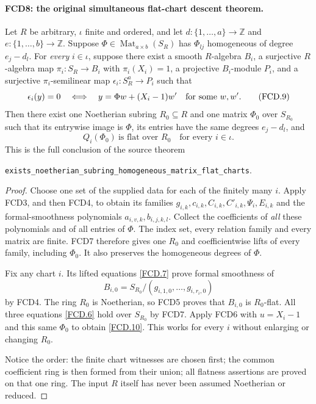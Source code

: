 \paragraph{FCD8: the original simultaneous flat-chart descent theorem.}
\label{claim:FCD8}
Let $R$ be arbitrary, $\iota$ finite and ordered, and let
$d:\{1,\ldots,a\}\to\mathbb Z$ and
$e:\{1,\ldots,b\}\to\mathbb Z$.  Suppose
$\Phi\in\operatorname{Mat}_{a\times b}(S_R)$ has
$\Phi_{lj}$ homogeneous of degree $e_j-d_l$.
For \emph{every} $i\in\iota$, suppose there exist a smooth
$R$-algebra $B_i$, a surjective $R$-algebra map $\pi_i:S_R\to B_i$
with $\pi_i(X_i)=1$, a projective $B_i$-module $P_i$, and a
surjective $\pi_i$-semilinear map $\epsilon_i:S_R^a\to P_i$
such that
\[
 \epsilon_i(y)=0
 \quad\Longleftrightarrow\quad
 y=\Phi w+(X_i-1)w'\quad\hbox{for some }w,w'.         \tag{FCD.9}\label{FCD.9}
\]
Then there exist one Noetherian subring $R_0\subseteq R$ and
one matrix $\Phi_0$ over $S_{R_0}$ such that its entrywise
image is $\Phi$, its entries have the same degrees $e_j-d_l$,
and
\[
 Q_i(\Phi_0)\ \text{is flat over }R_0
 \quad\text{for every }i\in\iota.                   \tag{FCD.10}\label{FCD.10}
\]
This is the full conclusion of the source theorem
\begin{center}
\texttt{exists\_\allowbreak{}noetherian\_\allowbreak{}subring\_\allowbreak{}}\allowbreak\texttt{homogeneous\_matrix\_flat\_charts}.
\end{center}

\begin{proof}
Choose one set of the supplied data for each of the finitely many
$i$.  Apply FCD3, and then FCD4, to obtain its families
$g_{i,k},c_{i,k},C_{i,k},C'_{i,k},\Psi_i,E_{i,k}$ and the
formal-smoothness polynomials $a_{i,v,k},b_{i,j,k,l}$.
Collect the coefficients of \emph{all} these polynomials and
of all entries of $\Phi$.  The index set, every relation family
and every matrix are finite.  FCD7 therefore gives one $R_0$
and coefficientwise lifts of every family, including $\Phi_0$.
It also preserves the homogeneous degrees of $\Phi$.

Fix any chart $i$.  Its lifted equations \eqref{FCD.7} prove
formal smoothness of
\[
 B_{i,0}=S_{R_0}/(g_{i,1,0},\ldots,g_{i,r_i,0})
\]
by FCD4.  The ring $R_0$ is Noetherian, so FCD5 proves that
$B_{i,0}$ is $R_0$-flat.  All three equations
\eqref{FCD.6} hold over $S_{R_0}$ by FCD7.  Apply FCD6 with
$u=X_i-1$ and this same $\Phi_0$ to obtain \eqref{FCD.10}.
This works for every $i$ without enlarging or changing $R_0$.

Notice the order: the finite chart witnesses are chosen first;
the common coefficient ring is then formed from their union;
all flatness assertions are proved on that one ring.  The input
$R$ itself has never been assumed Noetherian or reduced.
\end{proof}


